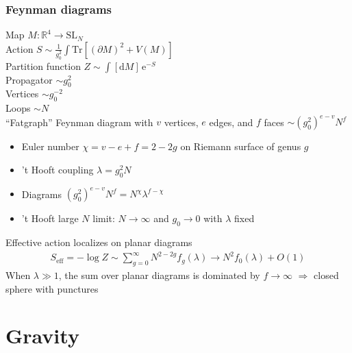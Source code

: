 \documentclass[12pt]{article}
\begin{document}
\subsubsection{Feynman diagrams}
Map $M:\mathbb R^4 \to \mathrm{SL}_N$\\
Action $S\sim \frac 1{g_0^2}  \int \mathrm {Tr} [(\partial M)^2+V(M)]$\\
Partition function $Z\sim \int [\mathrm dM]\,\mathrm e^{-S} $\\
Propagator $\sim g_0^2$\\
Vertices $\sim g_0^{-2}$\\
Loops $\sim N$\\
``Fatgraph'' Feynman diagram with $v$ vertices, $e$ edges, and $f$ faces $\sim (g_0^2)^{e-v}N^f$
\begin{itemize}
\item Euler number $\chi = v-e+f = 2-2g$ on Riemann surface of genus $g$
\item 't Hooft coupling $\lambda = g_0^2 N$
\item Diagrams $(g_0^2)^{e-v}N^f=N^\chi \lambda^{f-\chi}$
\item 't Hooft large $N$ limit: $N\to \infty$ and $g_0\to 0$ with $\lambda$ fixed
\end{itemize}
Effective action localizes on planar diagrams
\begin{eqnarray}
S_\mathrm{eff}=-\log Z\sim \sum_{g=0}^\infty N^{2-2g} f_g(\lambda)\longrightarrow N^2 f_0(\lambda)+O(1)
\end{eqnarray}
When $\lambda \gg 1$, the sum over planar diagrams is dominated by $f\to \infty$ $\Rightarrow$ closed sphere with punctures

\section{Gravity}

\end{document}
